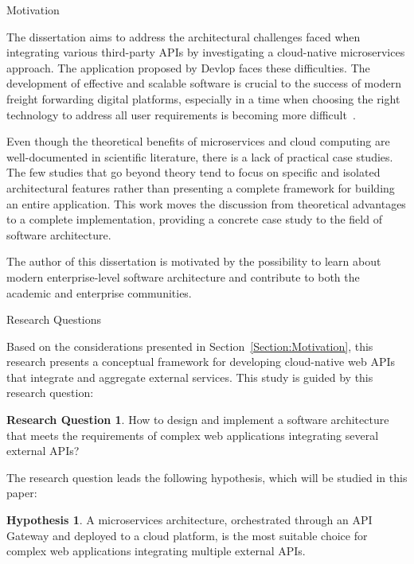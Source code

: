 \documentclass[12pt, reqno, oneside]{amsbook}
\makeatletter
\def\section{\@startsection{section}{1}%
      \z@{.5\linespacing\@plus.7\linespacing}{.25\linespacing}%
      {\normalfont\bfseries\flushleft}}
\theoremstyle{definition}
\theoremstyle{definition}
\newtheorem{hypothesis}{Hypothesis}
\newtheorem{research_question}{Research Question}
\numberwithin{section}{chapter}
\numberwithin{table}{chapter}
\numberwithin{figure}{chapter}
\makeatother
\begin{document}
\pagebreak

\section{Motivation}
\label{Section:Motivation}

The dissertation aims to address the architectural challenges faced when integrating various third-party \acp{API} by investigating a cloud-native microservices approach. The application proposed by Devlop faces these difficulties. The development of effective and scalable software is crucial to the success of modern freight forwarding digital platforms, especially in a time when choosing the right technology to address all user requirements is becoming more difficult~\cite{Mushica2024}.

Even though the theoretical benefits of microservices and cloud computing are well-documented in scientific literature, there is a lack of practical case studies. The few studies that go beyond theory tend to focus on specific and isolated architectural features rather than presenting a complete framework for building an entire application. This work moves the discussion from theoretical advantages to a complete implementation, providing a concrete case study to the field of software architecture.

The author of this dissertation is motivated by the possibility to learn about modern enterprise-level software architecture and contribute to both the academic and enterprise communities.

\section{Research Questions}
\label{Section:Research_Questions}

Based on the considerations presented in Section~\ref{Section:Motivation}, this research presents a conceptual framework for developing cloud-native web \acp{API} that integrate and aggregate external services. This study is guided by this research question:
\begin{research_question}
  How to design and implement a software architecture that meets the requirements of complex web applications integrating several external \acp{API}?
\end{research_question}

The research question leads the following hypothesis, which will be studied in this paper:

\begin{hypothesis}
  A microservices architecture, orchestrated through an \ac{API} Gateway and deployed to a cloud platform, is the most suitable choice for complex web applications integrating multiple external \acp{API}.
\end{hypothesis}
\end{document}
